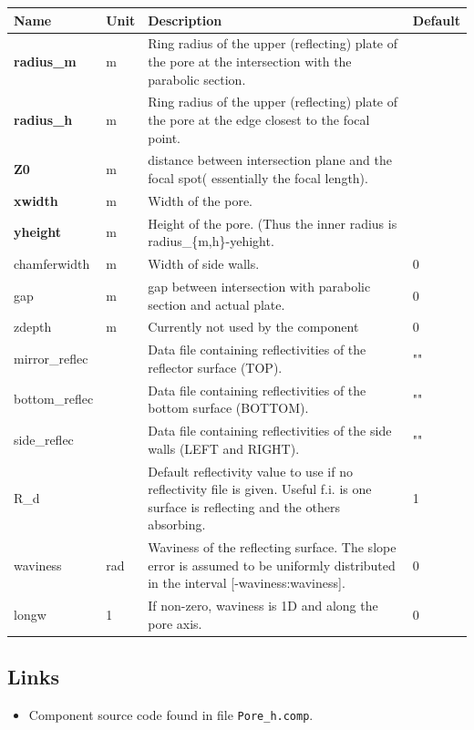 \begin{longtable}{p{}p{}p{}p{}}
\toprule
\textbf{Name} & \textbf{Unit} & \textbf{Description} & \textbf{Default} \\
\midrule
\endhead
\textbf{radius\_m} & m & Ring radius of the upper (reflecting) plate of the pore at the intersection with the parabolic section. &  \\
\textbf{radius\_h} & m & Ring radius of the upper (reflecting) plate of the pore at the edge closest to the focal point. &  \\
\textbf{Z0} & m & distance between intersection plane and the focal spot( essentially the focal length). &  \\
\textbf{xwidth} & m & Width of the pore. &  \\
\textbf{yheight} & m & Height of the pore. (Thus the inner radius is radius\_\{m,h\}-yehight. &  \\
chamferwidth & m & Width of side walls. & 0 \\
gap & m & gap between intersection with parabolic section and actual plate. & 0 \\
zdepth & m & Currently not used by the component & 0 \\
mirror\_reflec &   & Data file containing reflectivities of the reflector surface (TOP). & "" \\
bottom\_reflec &   & Data file containing reflectivities of the bottom surface (BOTTOM). & "" \\
side\_reflec &   & Data file containing reflectivities of the side walls (LEFT and RIGHT). & "" \\
R\_d &   & Default reflectivity value to use if no reflectivity file is given. Useful f.i. is one surface is reflecting and the others absorbing. & 1 \\
waviness & rad & Waviness of the reflecting surface. The slope error is assumed to be uniformly distributed in the interval [-waviness:waviness]. & 0 \\
longw & 1 & If non-zero, waviness is 1D and along the pore axis. & 0 \\
\bottomrule
\end{longtable}

\subsection*{Links}
\begin{itemize}
  \item Component source code found in file \texttt{Pore\_h.comp}.
\end{itemize}
